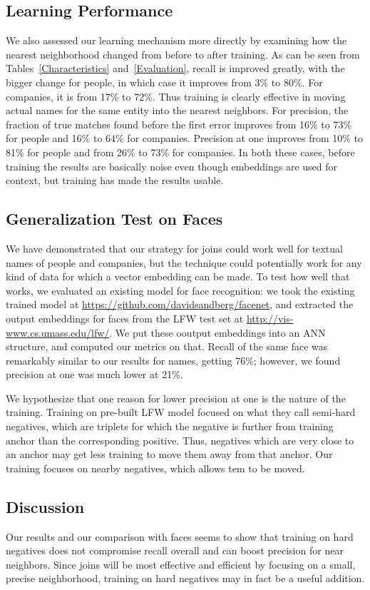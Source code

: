 \subsection{Learning Performance}

 We also assessed our learning mechanism more directly by examining how the nearest neighborhood changed from before to after training.  As can be seen from Tables~\ref{Characteristics} and~\ref{Evaluation}, recall is improved greatly, with the bigger change for people, in which case it improves from 3\% to 80\%.  For companies, it is from 17\% to 72\%.  Thus training is clearly effective in moving actual names for the same entity into the nearest neighbors.  For precision, the fraction of true matches found before the first error improves from 16\% to 73\% for people and 16\% to 64\% for companies.  Precision at one improves from 10\% to 81\% for people and from 26\% to 73\% for companies.  In both these cases, before training the results are basically noise even though embeddings are used for context, but training has made the results usable.

\subsection{Generalization Test on Faces}

 We have demonstrated that our strategy for joins could work well for textual names of people and companies, but the technique could potentially work for any kind of data for which a vector embedding can be made.  To test how well that works, we evaluated an existing model for face recognition: we took the existing trained model at \url{https://github.com/davidsandberg/facenet}, and extracted the output embeddings for faces from the LFW test set at \url{http://vis-www.cs.umass.edu/lfw/}.  We put these ooutput embeddings into an ANN structure, and computed our metrics on that.  Recall of the same face was remarkably similar to our results for names, getting 76\%; however, we found precision at one was much lower at 21\%.

 We hypothesize that one reason for lower precision at one is the nature of the training.  Training on pre-built LFW model focused on what they call semi-hard negatives, which are triplets for which the negative is further from training anchor than the corresponding positive.  Thus, negatives which are very close to an anchor may get less training to move them away from that anchor.  Our training focuses on nearby negatives, which allows tem to be moved.

\subsection{Discussion}

 Our results and our comparison with faces seems to show that training on hard negatives does not compromise recall overall and can boost precision for near neighbors.  Since joins will be most effective and efficient by focusing on a small, precise neighborhood, training on hard negatives may in fact be a useful addition.
